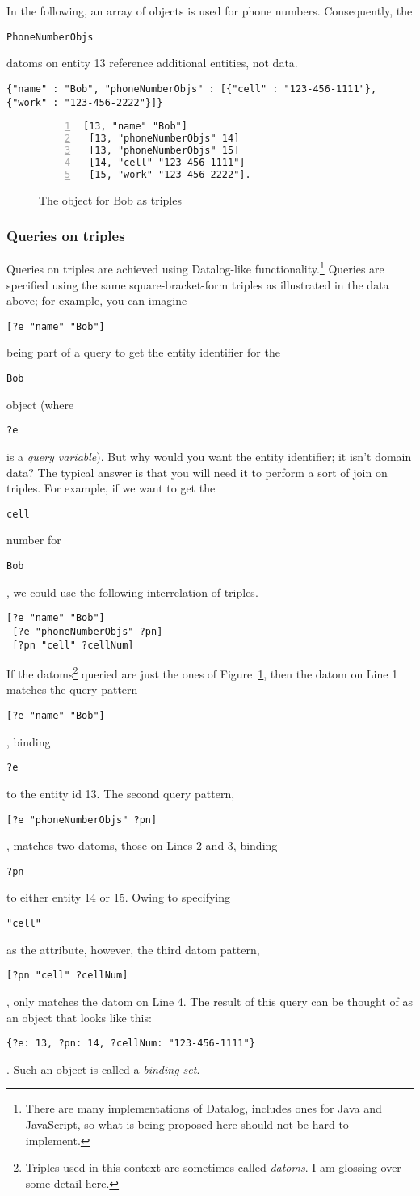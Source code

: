 \documentclass[9pt,letterpaper]{article}
\newcommand{\stt}[1]{\begin{footnotesize}\texttt{#1}\end{footnotesize}}
\begin{document}
In the following, an array of objects is used for phone numbers.
Consequently, the \stt{PhoneNumberObjs} datoms on entity 13 reference additional entities, not data.

\begin{lstlisting}[basicstyle=\ttfamily\scriptsize]
{"name" : "Bob", "phoneNumberObjs" : [{"cell" : "123-456-1111"}, {"work" : "123-456-2222"}]}
\end{lstlisting}

\begin{figure}[H]
  \caption{The object for Bob as triples}
  \label{code:bob-phone}
\begin{lstlisting}[numberstyle=\scriptsize,basicstyle=\ttfamily\scriptsize,numbers=left,stepnumber=1,breaklines=true]
 [13, "name" "Bob"]
 [13, "phoneNumberObjs" 14]
 [13, "phoneNumberObjs" 15]
 [14, "cell" "123-456-1111"]
 [15, "work" "123-456-2222"].
\end{lstlisting}
\end{figure}

\subsubsection{Queries on triples}

Queries on triples are achieved using Datalog-like functionality.\footnote{There are many implementations of Datalog, includes ones for Java and JavaScript, so what is being proposed here should not be hard to implement.}
Queries are specified using the same square-bracket-form triples as illustrated in the data above;
for example, you can imagine \stt{[?e "name" "Bob"]} being part of a query to get the entity identifier for the \stt{Bob} object (where \stt{?e} is a \textit{query variable}).
But why would you want the entity identifier; it isn't domain data?
The typical answer is that you will need it to perform a sort of join on triples.
For example, if we want to get the \stt{cell} number for \stt{Bob}, we could use the following interrelation of triples.

\begin{lstlisting}[basicstyle=\ttfamily\scriptsize]
 [?e "name" "Bob"]
 [?e "phoneNumberObjs" ?pn]
 [?pn "cell" ?cellNum]
\end{lstlisting}

If the datoms\footnote{Triples used in this context are sometimes called \textit{datoms}. I am glossing over some detail here.} queried are just the ones of
Figure~\ref{code:bob-phone}, then the datom on Line 1 matches the query pattern \stt{[?e "name" "Bob"]}, binding \stt{?e} to the entity id 13.
The second query pattern, \stt{[?e "phoneNumberObjs" ?pn]}, matches two datoms, those on Lines 2 and 3, binding \stt{?pn} to either entity 14 or 15. 
Owing to specifying \stt{"cell"} as the attribute, however, the third datom pattern, \stt{[?pn "cell" ?cellNum]}, only matches the datom on Line 4.
The result of this query can be thought of as an object that looks like this: \stt{\{?e: 13, ?pn: 14, ?cellNum: "123-456-1111"\}}.
Such an object is called a \textit{binding set}. 
\end{document}
